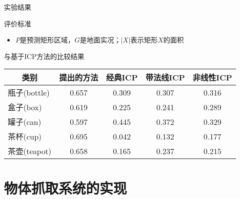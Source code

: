 \documentclass[xcolor=table,compress,blue]{beamer}
\begin{document}
	\begin{frame}{实验结果}
		\vspace{-8pt}
		\begin{exampleblock}{评价标准}
			\begin{itemize}
				\item \footnotesize{$P$是预测矩形区域，$G$是地面实况；$|X|$表示矩形$X$的面积}
			\end{itemize}
		\end{exampleblock}
		\vspace{-8pt}
		\begin{exampleblock}{与基于ICP方法的比较结果}
			\begin{table}[htbp]
				\centering
				\begin{tabular}{lcccc}
					\toprule
					\multicolumn{1}{c}{类别}    & \multicolumn{1}{l}{提出的方法} & \multicolumn{1}{l}{经典ICP} & \multicolumn{1}{l}{带法线ICP} & 非线性ICP			 \\
					\midrule
					瓶子(bottle)   & 0.657 & 0.309 & 0.307 & 0.316			 \\
					盒子(box)    & 0.619 & 0.225 & 0.241 & 0.289			 \\
					罐子(can)    & 0.597 & 0.445 & 0.372 & 0.329			 \\
					茶杯(cup)     & 0.695 & 0.042 & 0.132 & 0.177			 \\
					茶壶(teapot)    & 0.658 & 0.165 & 0.237 & 0.215			 \\
					\bottomrule
				\end{tabular}%
				\label{TAB RegistrationCompare}%
			\end{table}%
		\end{exampleblock}
	\end{frame}	


\section{物体抓取系统的实现}	
\end{document}
